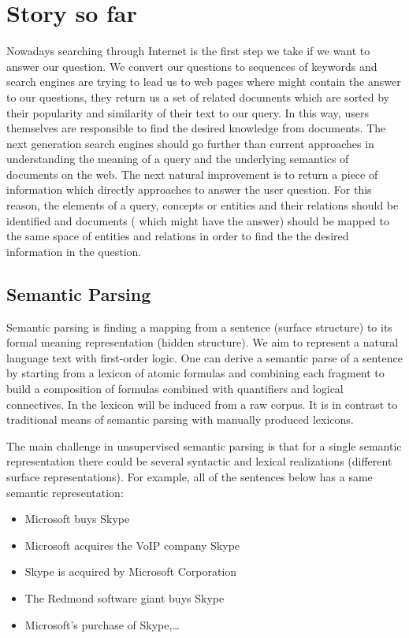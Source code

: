 \chapter{Story so far}
Nowadays searching through Internet is the first step we take if we want to
answer our question.
We convert our questions to sequences of keywords and search engines are trying 
to lead us to web pages where might contain the answer to our questions, they return us a set of related
documents which are sorted by their popularity and similarity of their text to our query.
In this way, users themselves are responsible to find the desired knowledge 
from documents. The next generation search engines should go further than current 
approaches in understanding the meaning of a query and the underlying semantics of documents on 
the web. The next natural improvement is to return a piece of information which directly approaches to 
answer the user question. For this reason, the elements of a query, concepts or entities and 
their relations should be identified and documents ( which might have the answer) should be mapped to the 
same space of entities and relations in order to find the the desired information in the question.

\section{Semantic Parsing}
\label{sec:usp-sem-parse}

Semantic parsing is finding a mapping from a sentence (surface structure) to its
formal meaning representation (hidden structure).
We aim to represent a natural language text with first-order logic. One can derive
a semantic parse of a sentence by starting from a lexicon of atomic formulas and combining each fragment to build a composition of formulas combined with quantifiers and logical connectives. In \citep{Poon2009} the lexicon will be induced from a raw corpus. It is in contrast to traditional means of semantic parsing with manually
  produced lexicons.
  
  The main challenge in unsupervised semantic parsing is that for a single semantic representation there could be
  several syntactic and lexical realizations (different surface
  representations). For example, all of the sentences below has a same semantic
  representation:
   \begin{itemize}
     \item Microsoft buys Skype
     \item Microsoft acquires the VoIP company Skype
     \item Skype is acquired by Microsoft Corporation
     \item The Redmond software giant buys Skype
     \item Microsoft’s purchase of Skype,\ldots
   \end{itemize}  
  
